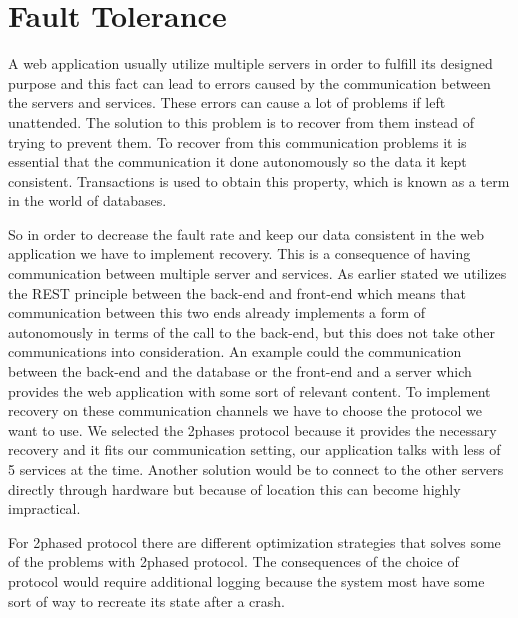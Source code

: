 \section{Fault Tolerance}
A web application usually utilize multiple servers in order to fulfill its designed purpose and this fact can lead to errors caused by the communication between the servers and services. These errors can cause a lot of problems if left unattended. The solution to this problem is to recover from them instead of trying to prevent them. To recover from this communication problems it is essential that the communication it done autonomously so the data it kept consistent. Transactions is used to obtain this property, which is known as a term in the world of databases.

So in order to decrease the fault rate and keep our data consistent in the web application we have to implement recovery. This is a consequence of having communication between multiple server and services. As earlier stated we utilizes the REST principle between the back-end and front-end which means that communication between this two ends already implements a form of autonomously in terms of the call to the back-end, but this does not take other communications into consideration. An example could the communication between the back-end and the database or the front-end and a server which provides the web application with some sort of relevant content. To implement recovery on these communication channels we have to choose the protocol we want to use. We selected the 2phases protocol because it provides the necessary recovery and it fits our communication setting, our application talks with less of 5 services at the time. Another solution would be to connect to the other servers directly through hardware but because of location this can become highly impractical.

For 2phased protocol there are different optimization strategies that solves some of the problems with 2phased protocol. The consequences of the choice of protocol would require additional logging because the system most have some sort of way to recreate its state after a crash.